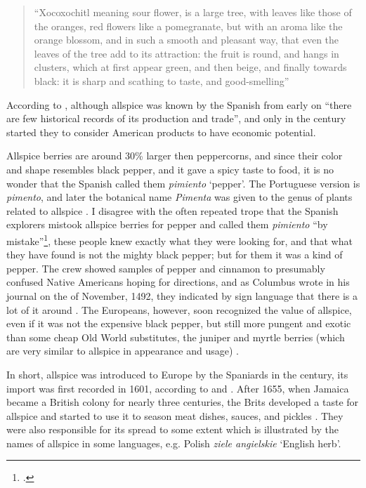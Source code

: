 \begin{quote}
    ``Xocoxochitl meaning sour flower, is a large tree, with leaves like those of the oranges, red flowers like a pomegranate, but with an aroma like the orange blossom, and in such a smooth and pleasant way, that even the leaves of the tree add to its attraction: the fruit is round, and hangs in clusters, which at first appear green, and then beige, and finally towards black: it is sharp and scathing to taste, and good-smelling'' 
\end{quote}

According to \textcite{machuca_past_2020}, although allspice was known by the Spanish from early on ``there are few historical records of its production and trade'', and only in the  century started they to consider American products to have economic potential.
 
Allspice berries are around 30\% larger then peppercorns, and since their color and shape resembles black pepper, and it gave a spicy taste to food, it is no wonder that the Spanish called them \textit{pimiento} `pepper'. The Portuguese version is \textit{pimento}, and later the botanical name \textit{Pimenta} was given to the genus of plants related to allspice \autocite[26]{farrell_spices_1985}. I disagree with the often repeated trope that the Spanish explorers mistook allspice berries for pepper and called them \textit{pimiento} ``by mistake''\footcite[allspice ]{britannica_allspice_nodate}, these people knew exactly what they were looking for, and that what they have found is not the mighty black pepper; but for them it was a kind of pepper. The crew showed samples of pepper and cinnamon to presumably confused Native Americans hoping for directions, and as Columbus wrote in his journal on the  of November, 1492, they indicated by sign language that there is a lot of it around \autocites[21]{duke_crc_2002}[67]{columbus_journal_2010}. The Europeans, however, soon recognized the value of allspice, even if it was not the expensive black pepper, but still more pungent and exotic than some cheap Old World substitutes, the juniper and myrtle berries (which are very similar to allspice in appearance and usage)  \autocite[150]{dalby_dangerous_2000}.

In short, allspice was introduced to Europe by the Spaniards in the  century, its import was first recorded in 1601, according to \textcite{britannica_allspice_nodate} and \textcite[26]{farrell_spices_1985}. After 1655, when Jamaica became a British colony for nearly three centuries, the Brits developed a taste for allspice and started to use it to season meat dishes, sauces, and pickles \autocite[74]{green_field_2006}. They were also responsible for its spread to some extent which is illustrated by the names of allspice in some languages, e.g. Polish \textit{ziele angielskie} `English herb'.


